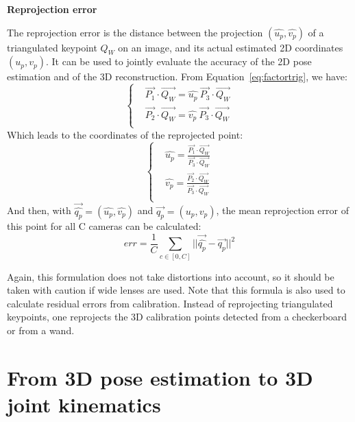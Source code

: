 \vspace*{0.5cm}
\noindent\textbf{Reprojection error}  

The reprojection error is the distance between the projection $(\widehat{u_p}, \widehat{v_p})$ of a triangulated keypoint $Q_W$ on an image, and its actual estimated 2D coordinates $(u_p, v_p)$. It can be used to jointly evaluate the accuracy of the 2D pose estimation and of the 3D reconstruction. From Equation~\ref{eq:factortrig}, we have:
\begin{equation}
    \begin{cases}
      &  \overrightarrow{P_1}\cdot \overrightarrow{Q_W} = \widehat{u_p} \ \overrightarrow{P_3} \cdot \overrightarrow{Q_W}\\
      &  \overrightarrow{P_2} \cdot \overrightarrow{Q_W} = \widehat{v_p} \ \overrightarrow{P_3} \cdot \overrightarrow{Q_W}\\
    \end{cases}
\end{equation}
Which leads to the coordinates of the reprojected point:
\begin{equation}
    \begin{cases}
      & \widehat{u_p} = \frac{\overrightarrow{P_1}\cdot \overrightarrow{Q_W}}{\overrightarrow{P_3} \cdot \overrightarrow{Q_W}}\\
      & \widehat{v_p} = \frac{\overrightarrow{P_2}\cdot \overrightarrow{Q_W}}{\overrightarrow{P_3} \cdot \overrightarrow{Q_W}}\\
    \end{cases}
\end{equation}
And then, with $\overrightarrow{\widehat{q_p}} = (\widehat{u_p}, \widehat{v_p})$ and $\overrightarrow{q_p} = (u_p, v_p)$, the mean reprojection error of this point for all C cameras can be calculated:
\begin{equation}
  \boxed{
  err = \frac{1}{C} \sum_{c \in [0,C]} ||\overrightarrow{\widehat{q_p}}-\overrightarrow{q_p}||^2 
  }
\end{equation}

Again, this formulation does not take distortions into account, so it should be taken with caution if wide lenses are used. Note that this formula is also used to calculate residual errors from calibration. Instead of reprojecting triangulated keypoints, one reprojects the 3D calibration points detected from a checkerboard or from a wand.



\newpage
\section{From 3D pose estimation to 3D joint kinematics}\label{sec:3D joint kin}

